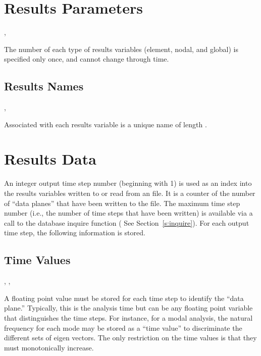 \section{Results Parameters}

\api{}, 


The number of each type of results variables (element, nodal,
and global) is specified only once, and cannot change through
time.

\subsection{Results Names}

\begin{spacing}{1.5}
\api {}, 
\end{spacing}

Associated with each results variable is a unique name of
length .



\section{Results Data}


An integer output time step number (beginning with 1) is used as an
index into the results variables written to or read from an \exo{}
file. It is a counter of the number of ``data planes'' that have been
written to the file. The maximum time step number (i.e., the number of
time steps that have been written) is available via a call to the
database inquire function ( See Section~\ref{s:inquire}). For each
output time step, the following information is stored.

\subsection{Time Values}

\begin{spacing}{1.5}
\api {}, , 
\end{spacing}

A floating point value must be stored for each time step to identify
the ``data plane.'' Typically, this is the analysis time but can be
any floating point variable that distinguishes the time steps. For
instance, for a modal analysis, the natural frequency for each mode
may be stored as a ``time value'' to discriminate the different sets
of eigen vectors. The only restriction on the time values is that they
must monotonically increase.

